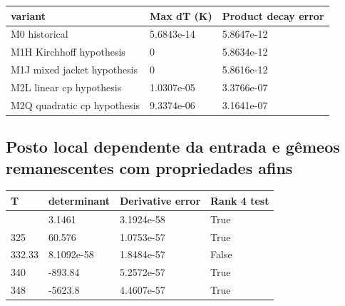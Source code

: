 \documentclass[
  11pt,
]{article}
\begin{document}
\begingroup\footnotesize

\begin{longtable}[]{@{}lll@{}}
\toprule\noalign{}
variant & Max dT (K) & Product decay error \\
\midrule\noalign{}
\endhead
\bottomrule\noalign{}
\endlastfoot
M0 historical & 5.6843e-14 & 5.8647e-12 \\
M1H Kirchhoff hypothesis & 0 & 5.8634e-12 \\
M1J mixed jacket hypothesis & 0 & 5.8616e-12 \\
M2L linear cp hypothesis & 1.0307e-05 & 3.3766e-07 \\
M2Q quadratic cp hypothesis & 9.3374e-06 & 3.1641e-07 \\
\end{longtable}

\endgroup

\hypertarget{posto-local-dependente-da-entrada-e-guxeameos-remanescentes-com-propriedades-afins}{%
\subsection{Posto local dependente da entrada e gêmeos remanescentes com
propriedades
afins}\label{posto-local-dependente-da-entrada-e-guxeameos-remanescentes-com-propriedades-afins}}

\begingroup\footnotesize

\begin{longtable}[]{@{}llll@{}}
\toprule\noalign{}
T & determinant & Derivative error & Rank 4 test \\
\midrule\noalign{}
\endhead
\bottomrule\noalign{}
\endlastfoot
315 & 3.1461 & 3.1924e-58 & True \\
325 & 60.576 & 1.0753e-57 & True \\
332.33 & 8.1092e-58 & 1.8484e-57 & False \\
340 & -893.84 & 5.2572e-57 & True \\
348 & -5623.8 & 4.4607e-57 & True \\
\end{longtable}

\endgroup

\begingroup\footnotesize
\end{document}
